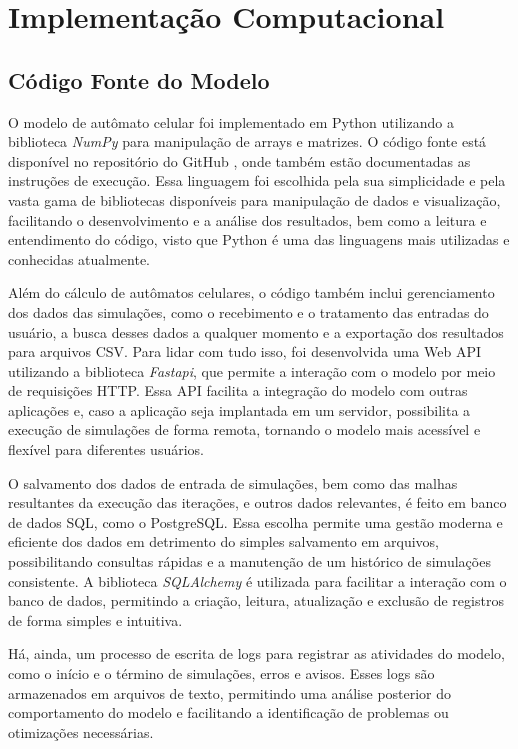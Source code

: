 \documentclass[12pt,oneside]{report}
\begin{document}
\section{Implementação Computacional}

\subsection{Código Fonte do Modelo}

O modelo de autômato celular foi implementado em Python utilizando a biblioteca \textit{NumPy} para manipulação de arrays e matrizes. O código fonte está disponível no repositório do GitHub \textbf{}, onde também estão documentadas as instruções de execução. Essa linguagem foi escolhida pela sua simplicidade e pela vasta gama de bibliotecas disponíveis para manipulação de dados e visualização, facilitando o desenvolvimento e a análise dos resultados, bem como a leitura e entendimento do código, visto que Python é uma das linguagens mais utilizadas e conhecidas atualmente.

Além do cálculo de autômatos celulares, o código também inclui gerenciamento dos dados das simulações, como o recebimento e o tratamento das entradas do usuário, a busca desses dados a qualquer momento e a exportação dos resultados para arquivos CSV. Para lidar com tudo isso, foi desenvolvida uma Web API utilizando a biblioteca \textit{Fastapi}, que permite a interação com o modelo por meio de requisições HTTP. Essa API facilita a integração do modelo com outras aplicações e, caso a aplicação seja implantada em um servidor, possibilita a execução de simulações de forma remota, tornando o modelo mais acessível e flexível para diferentes usuários.

O salvamento dos dados de entrada de simulações, bem como das malhas resultantes da execução das iterações, e outros dados relevantes, é feito em banco de dados SQL, como o PostgreSQL. Essa escolha permite uma gestão moderna e eficiente dos dados em detrimento do simples salvamento em arquivos, possibilitando consultas rápidas e a manutenção de um histórico de simulações consistente. A biblioteca \textit{SQLAlchemy} é utilizada para facilitar a interação com o banco de dados, permitindo a criação, leitura, atualização e exclusão de registros de forma simples e intuitiva.

Há, ainda, um processo de escrita de logs para registrar as atividades do modelo, como o início e o término de simulações, erros e avisos. Esses logs são armazenados em arquivos de texto, permitindo uma análise posterior do comportamento do modelo e facilitando a identificação de problemas ou otimizações necessárias.
\end{document}
